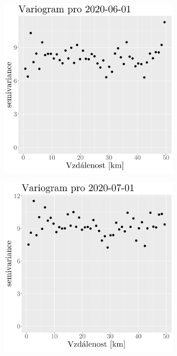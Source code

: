 \begin{figure}
\begin{subfigure}{0.30\textwidth}
		\caption{}
		\label{fig:variogram5}
	\end{subfigure}
	\hfill
	\begin{subfigure}{0.30\textwidth}
		\includegraphics[width=\textwidth]{img/ch2/variograms/variogram_max15cm6.png}
		\caption{}
		\label{fig:variogram6}
	\end{subfigure}
\hfill
	\begin{subfigure}{0.30\textwidth}
		\includegraphics[width=\textwidth]{img/ch2/variograms/variogram_max15cm7.png}

\end{subfigure}
\end{figure}
